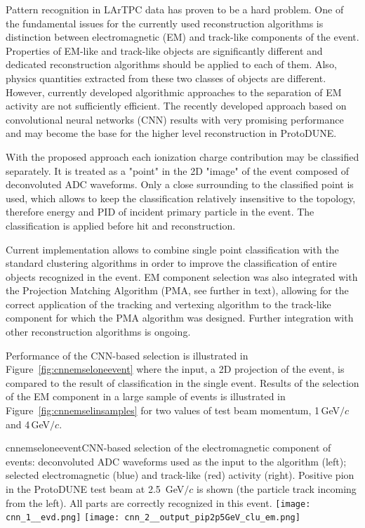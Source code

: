 Pattern recognition in LArTPC data has proven to be a hard problem. One of the
fundamental issues for the currently used reconstruction algorithms is distinction
between electromagnetic (EM) and track-like components of the event. Properties of
EM-like and track-like objects are significantly different and dedicated
reconstruction algorithms should be applied to each of them. Also, physics
quantities extracted from these two classes of objects are different. However,
currently developed algorithmic approaches to the separation of EM activity are
not sufficiently efficient. The recently developed approach based on convolutional
neural networks (CNN) results with very promising performance and may become the
base for the higher level reconstruction in ProtoDUNE.

With the proposed approach each ionization charge contribution may be classified
separately. It is treated as a "point" in the 2D "image" of the event composed of
deconvoluted ADC waveforms. Only a close surrounding to the classified point is used,
which allows to keep the classification relatively insensitive to the topology,
therefore energy and PID of incident primary particle in the event. The classification
is applied before hit and reconstruction.

Current implementation allows to combine single point classification with the standard
clustering algorithms in order to improve the classification of entire objects
recognized in the event. EM component selection was also integrated with the Projection
Matching Algorithm (PMA, see further in text), allowing for the correct application of
the tracking and vertexing algorithm to the track-like component for which the PMA
algorithm was designed. Further integration with other reconstruction algorithms is
ongoing.

Performance of the CNN-based selection is illustrated in Figure~\ref{fig:cnnemseloneevent}
where the input, a 2D projection of the event, is compared to the result of classification
in the single event. Results of the selection of the EM component in a large sample of events
is illustrated in Figure~\ref{fig:cnnemselinsamples} for two values of test beam momentum,
1\,GeV$/c$ and 4\,GeV$/c$.

\begin{cdrfigure}{cnnemseloneevent}{CNN-based
selection of the electromagnetic component of events: deconvoluted ADC waveforms used
as the input to the algorithm (left); selected electromagnetic (blue) and
track-like (red) activity (right). Positive pion in the ProtoDUNE test beam at
2.5~GeV$/c$ is shown (the particle track incoming from the left). All parts are
correctly recognized in this event.}
\texttt{[image: cnn\_1\_\_evd.png]}
\texttt{[image: cnn\_2\_\_output\_pip2p5GeV\_clu\_em.png]}
\end{cdrfigure}

